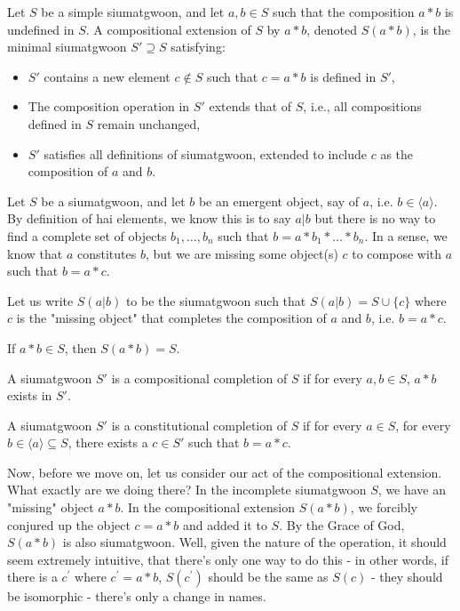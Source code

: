 \begin{definition}
    Let $S$ be a simple siumatgwoon, and let $a, b \in S$ such that the composition $a * b$ is undefined in $S$. A compositional extension of $S$ by $a * b$, denoted $S(a * b)$, is the minimal siumatgwoon $S' \supseteq S$ satisfying:
    \begin{itemize}
        \item $S'$ contains a new element $c \notin S$ such that $c = a * b$ is defined in $S'$,
        \item The composition operation in $S'$ extends that of $S$, i.e., all compositions defined in $S$ remain unchanged,
        \item $S'$ satisfies all definitions of siumatgwoon, extended to include $c$ as the composition of $a$ and $b$.
    \end{itemize}
\end{definition}

\begin{definition}
    Let $S$ be a siumatgwoon, and let $b$ be an emergent object, say of $a$, i.e. $b \in \langle a \rangle$. By definition of hai elements, we know this is to say $a|b$ but there is no way to find a complete set of objects $b_1, \ldots, b_n$ such that $b = a *b_1 * \ldots * b_n$.
    In a sense, we know that $a$ constitutes $b$, but we are missing some object(s) $c$ to compose with $a$ such that $b = a * c$.
    
    Let us write $S(a|b)$ to be the siumatgwoon such that $S(a|b) = S \cup \{c\}$ where $c$ is the "missing object" that completes the composition of $a$ and $b$, i.e. $b = a * c$.

    If $a*b \in S$, then $S(a*b) = S$.
\end{definition}

\begin{definition}
    A siumatgwoon $S'$ is a compositional completion of $S$ if for every $a, b \in S$, $a*b$ exists in $S'$.

\end{definition}

\begin{definition}
    A siumatgwoon $S'$ is a constitutional completion of $S$ if for every $a\in S$, for every $b\in \langle a \rangle \subseteq S$, there exists a $c\in S'$ such that $b = a * c$.
\end{definition}


Now, before we move on, let us consider our act of the compositional extension. What exactly are we doing there? In the incomplete siumatgwoon $S$, we have an "missing" object $a*b$. In the compositional extension $S(a*b)$, we forcibly conjured up the object $c = a*b$ and added it to $S$. By the Grace of God, $S(a*b)$ is also siumatgwoon. Well, given the nature of the operation, it should seem extremely intuitive, that there's only one way to do this - in other words, if there is a $c^{'}$ where $c^{'}=a*b$, $S(c^{'})$ should be the same as $S(c)$ - they should be isomorphic - there's only a change in names. 


